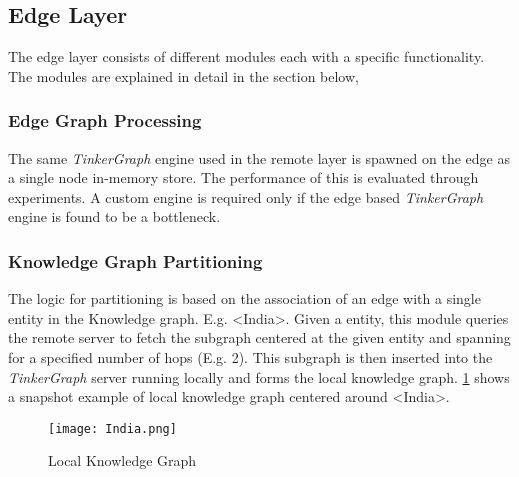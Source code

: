 \documentclass[conference]{IEEEtran}
\begin{document}
\subsection{Edge Layer}
The edge layer consists of different modules each with a specific functionality. The modules are explained in detail in the section below,

\subsubsection{Edge Graph Processing}
The same \emph{TinkerGraph} engine used in the remote layer is spawned on the edge as a single node in-memory store. The performance of this is evaluated through experiments. A custom engine is required only if the edge based \emph{TinkerGraph} engine is found to be a bottleneck.

\subsubsection{Knowledge Graph Partitioning}
The logic for partitioning is based on the association of an edge with a single entity in the Knowledge graph. E.g. <India>. Given a entity, this module queries the remote server to fetch the subgraph centered at the given entity and spanning for a specified number of hops (E.g. 2). This subgraph is then inserted into the \emph{TinkerGraph} server running locally and forms the local knowledge graph. \ref{fig:lkg} shows a snapshot example of local knowledge graph centered around <India>.

\begin{figure}[!t]
	\centering
	\texttt{[image: India.png]}
	\caption{Local Knowledge Graph}
	\label{fig:lkg}
\end{figure}
\end{document}
